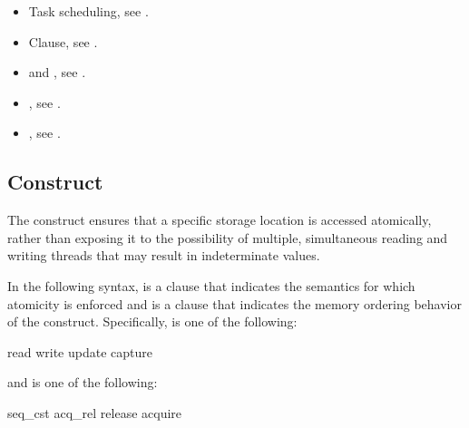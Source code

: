 \crossreferences
\begin{itemize}
\item Task scheduling, see 
.
\item {} Clause, see .

\item {} and , see
.

\item {}, see
.

\item {}, see
.

\end{itemize}










\subsection{ Construct}
\label{subsec:atomic Construct}
\summary
The  construct ensures that a specific storage location is accessed atomically, 
rather than exposing it to the possibility of multiple, simultaneous reading and writing 
threads that may result in indeterminate values.

\syntax
In the following syntax,  is a clause that indicates
the semantics for which atomicity is enforced and  is
a clause that indicates the memory ordering behavior of the construct.
Specifically,  is one of the following:

\begin{indentedcodelist}
read
write
update
capture
\end{indentedcodelist}

and  is one of the following:

\begin{indentedcodelist}
seq\_cst
acq\_rel
release
acquire
\end{indentedcodelist}

